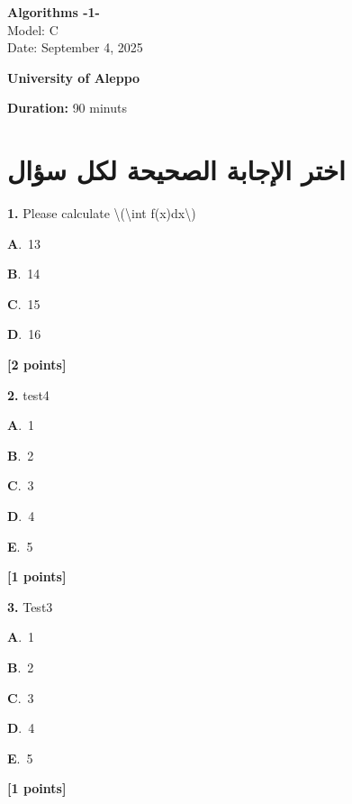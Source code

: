 \documentclass[12pt]{article}
\newcommand{\choice}[3]{%
  \noindent\textbf{#1}.~#2\hfill#3\par\vspace{0.25em}
}
\begin{document}
\begin{flushright}
{\Large \textbf{{\textenglish{Algorithms -1-}}}}\\[0.25em]
{\normalsize \textenglish{Model: }{\textenglish{C}}}\\[0.1em]
{\normalsize \textenglish{Date: }{\textenglish{September 4, 2025}}}
\end{flushright}

\vspace{0.6cm}

\noindent
\begin{minipage}[t]{0.65\textwidth}
  \raggedright
  \textbf{{\textenglish{University of Aleppo}}}\\[0.3em]
\end{minipage}\hfill
\begin{minipage}[t]{0.3\textwidth}
  \raggedleft
  \textenglish{\textbf{Duration: }}{\textenglish{90 minuts}}
\end{minipage}

\vspace{0.9cm}

\section*{اختر الإجابة الصحيحة لكل سؤال}

\noindent \textbf{\textenglish{1.}} {\textenglish{Please calculate \textbackslash{}(\textbackslash{}int f(x)dx\textbackslash{})}}

\noindent\choice{A}{{\textenglish{13}}}{}
\noindent\choice{B}{{\textenglish{14}}}{}
\noindent\choice{C}{{\textenglish{15}}}{}
\noindent\choice{D}{{\textenglish{16}}}{}
\hfill \textbf{[2 points]}\vspace{0.5em}

\noindent \textbf{\textenglish{2.}} {\textenglish{test4}}

\noindent\choice{A}{{\textenglish{1}}}{}
\noindent\choice{B}{{\textenglish{2}}}{}
\noindent\choice{C}{{\textenglish{3}}}{}
\noindent\choice{D}{{\textenglish{4}}}{}
\noindent\choice{E}{{\textenglish{5}}}{}
\hfill \textbf{[1 points]}\vspace{0.5em}

\noindent \textbf{\textenglish{3.}} {\textenglish{Test3}}

\noindent\choice{A}{{\textenglish{1}}}{}
\noindent\choice{B}{{\textenglish{2}}}{}
\noindent\choice{C}{{\textenglish{3}}}{}
\noindent\choice{D}{{\textenglish{4}}}{}
\noindent\choice{E}{{\textenglish{5}}}{}
\hfill \textbf{[1 points]}\vspace{0.5em}
\end{document}
